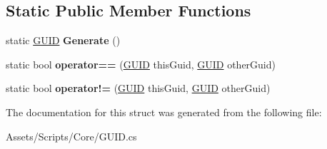 \subsection*{Static Public Member Functions}
\begin{DoxyCompactItemize}
\item 
\hypertarget{struct_hattori_game2_1_1_g_u_i_d_a73bd9e1dfede9d697f204cd81bb8a2f9}{}static \hyperlink{struct_hattori_game2_1_1_g_u_i_d}{G\+U\+I\+D} {\bfseries Generate} ()\label{struct_hattori_game2_1_1_g_u_i_d_a73bd9e1dfede9d697f204cd81bb8a2f9}

\item 
\hypertarget{struct_hattori_game2_1_1_g_u_i_d_a7eaea383b24b0445f28ba6a270324093}{}static bool {\bfseries operator==} (\hyperlink{struct_hattori_game2_1_1_g_u_i_d}{G\+U\+I\+D} this\+Guid, \hyperlink{struct_hattori_game2_1_1_g_u_i_d}{G\+U\+I\+D} other\+Guid)\label{struct_hattori_game2_1_1_g_u_i_d_a7eaea383b24b0445f28ba6a270324093}

\item 
\hypertarget{struct_hattori_game2_1_1_g_u_i_d_ad01f028bf168ead780f6d5d69c049819}{}static bool {\bfseries operator!=} (\hyperlink{struct_hattori_game2_1_1_g_u_i_d}{G\+U\+I\+D} this\+Guid, \hyperlink{struct_hattori_game2_1_1_g_u_i_d}{G\+U\+I\+D} other\+Guid)\label{struct_hattori_game2_1_1_g_u_i_d_ad01f028bf168ead780f6d5d69c049819}

\end{DoxyCompactItemize}


The documentation for this struct was generated from the following file\+:\begin{DoxyCompactItemize}
\item 
Assets/\+Scripts/\+Core/G\+U\+I\+D.\+cs\end{DoxyCompactItemize}
